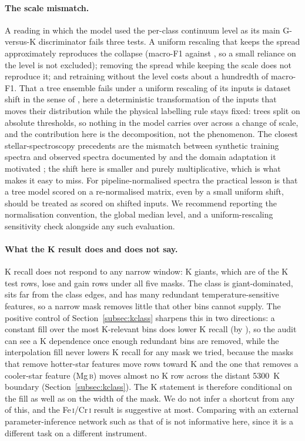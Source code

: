 \documentclass[11pt,a4paper]{article}
\newcommand{\Mgb}{Mg\,\textsc{b}\xspace}
\newcommand{\FeCr}{Fe\,\textsc{i}/Cr\,\textsc{i}\xspace}
\begin{document}
\paragraph{The scale mismatch.} A reading in which the model used the per-class continuum level as its main G-versus-K discriminator fails three tests. A uniform rescaling that keeps the spread approximately reproduces the collapse (macro-F1 \sdUniNineMacroF{} against \sdPolyMacroF, so a small reliance on the level is not excluded); removing the spread while keeping the scale does not reproduce it; and retraining without the level costs about a hundredth of macro-F1. That a tree ensemble fails under a uniform rescaling of its inputs is dataset shift in the sense of \citet{QuinoneroCandela2009Shift}, here a deterministic transformation of the inputs that moves their distribution while the physical labelling rule stays fixed: trees split on absolute thresholds, so nothing in the model carries over across a change of scale, and the contribution here is the decomposition, not the phenomenon. The closest stellar-spectroscopy precedents are the mismatch between synthetic training spectra and observed spectra documented by \citet{2020MNRAS.498.3817B} and the domain adaptation it motivated \citep{2021ApJ...906..130O}; the shift here is smaller and purely multiplicative, which is what makes it easy to miss. For pipeline-normalised spectra the practical lesson is that a tree model scored on a re-normalised matrix, even by a small uniform shift, should be treated as scored on shifted inputs. We recommend reporting the normalisation convention, the global median level, and a uniform-rescaling sensitivity check alongside any such evaluation.

\paragraph{What the K result does and does not say.} K recall does not respond to any narrow window: K giants, which are \lumAccNKGiant{} of the \nClassK{} K test rows, lose \kGiantLost{} and gain \kGiantGained{} rows under all five masks. The class is giant-dominated, sits far from the class edges, and has many redundant temperature-sensitive features, so a narrow mask removes little that other bins cannot supply. The positive control of Section~\ref{subsec:kclass} sharpens this in two directions: a constant fill over the \pcBinsTopHundred{} most K-relevant bins does lower K recall (by \pcConstTopHundredKDelta), so the audit can see a K dependence once enough redundant bins are removed, while the interpolation fill never lowers K recall for any mask we tried, because the masks that remove hotter-star features move rows toward K and the one that removes a cooler-star feature (\Mgb) moves almost no K row across the distant 5300~K boundary (Section~\ref{subsec:kclass}). The K statement is therefore conditional on the fill as well as on the width of the mask. We do not infer a shortcut from any of this, and the \FeCr result is suggestive at most. Comparing with an external parameter-inference network such as that of \citet{2024A&A...692A.228C} is not informative here, since it is a different task on a different instrument.
\end{document}
